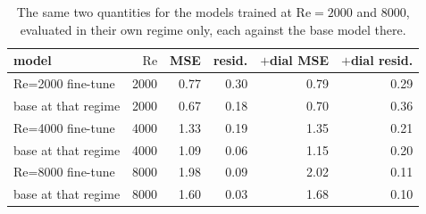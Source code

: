 \begin{table}[t]
  \centering
  \caption{The same two quantities for the models trained at $\mathrm{Re}=2000$ and $8000$, evaluated in their own regime only, each against the base model there.}
  \label{tab:mse-resid-inregime}
  \begin{tabular}{lrrrrr}
    \toprule
    model & $\mathrm{Re}$ & MSE & resid. & $+$dial MSE & $+$dial resid. \\
    \midrule
    Re=2000 fine-tune & 2000 & 0.77 & 0.30 & 0.79 & 0.29 \\
    \quad base at that regime & 2000 & 0.67 & 0.18 & 0.70 & 0.36 \\
    Re=4000 fine-tune & 4000 & 1.33 & 0.19 & 1.35 & 0.21 \\
    \quad base at that regime & 4000 & 1.09 & 0.06 & 1.15 & 0.20 \\
    Re=8000 fine-tune & 8000 & 1.98 & 0.09 & 2.02 & 0.11 \\
    \quad base at that regime & 8000 & 1.60 & 0.03 & 1.68 & 0.10 \\
    \bottomrule
  \end{tabular}
\end{table}
